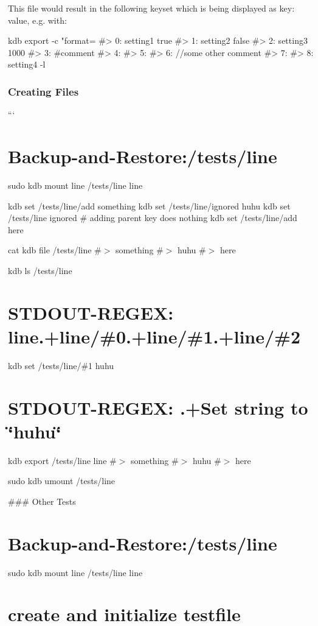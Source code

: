 This file would result in the following keyset which is being displayed as {\ttfamily key\+: value}, e.\+g. with\+:


\begin{DoxyCode}
kdb export -c "format=%
#> 0: setting1 true
#> 1: setting2 false
#> 2: setting3 1000
#> 3: #comment
#> 4:
#> 5:
#> 6: //some other comment
#> 7:
#> 8: setting4 -l
\end{DoxyCode}


\subsubsection*{Creating Files}

``` \section*{Backup-\/and-\/\+Restore\+:/tests/line}

sudo kdb mount line /tests/line line

kdb set /tests/line/add something kdb set /tests/line/ignored huhu kdb set /tests/line ignored \# adding parent key does nothing kdb set /tests/line/add here

cat {\ttfamily kdb file /tests/line} \#$>$ something \#$>$ huhu \#$>$ here

kdb ls /tests/line \section*{S\+T\+D\+O\+U\+T-\/\+R\+E\+G\+EX\+: line.+line/\#0.+line/\#1.+line/\#2}

kdb set /tests/line/\#1 huhu \section*{S\+T\+D\+O\+U\+T-\/\+R\+E\+G\+EX\+: .+\+Set string to \char`\"{}huhu\char`\"{}}

kdb export /tests/line line \#$>$ something \#$>$ huhu \#$>$ here

sudo kdb umount /tests/line 
\begin{DoxyCode}
### Other Tests
\end{DoxyCode}
 \section*{Backup-\/and-\/\+Restore\+:/tests/line}

sudo kdb mount line /tests/line line

\section*{create and initialize testfile}

